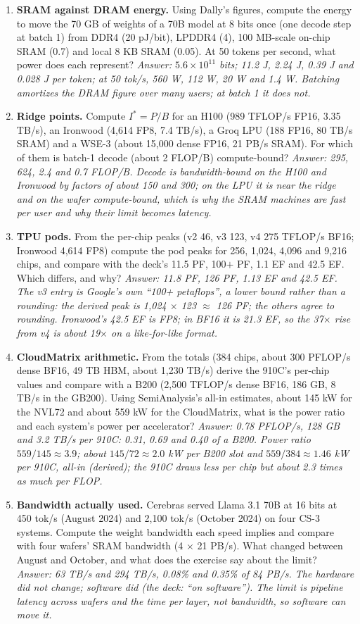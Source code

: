 \documentclass[11pt,letterpaper]{article}
\begin{document}
\begin{enumerate}[leftmargin=1.6em,itemsep=6pt]
\item \textbf{SRAM against DRAM energy.} Using Dally's figures, compute the energy to move the 70 GB of weights of a 70B model at 8 bits once (one decode step at batch 1) from DDR4 (20 pJ/bit), LPDDR4 (4), 100 MB-scale on-chip SRAM (0.7) and local 8 KB SRAM (0.05). At 50 tokens per second, what power does each represent? \emph{Answer: $5.6\times10^{11}$ bits; 11.2 J, 2.24 J, 0.39 J and 0.028 J per token; at 50 tok/s, 560 W, 112 W, 20 W and 1.4 W. Batching amortizes the DRAM figure over many users; at batch 1 it does not.}
\item \textbf{Ridge points.} Compute $I^\ast = P/B$ for an H100 (989 TFLOP/s FP16, 3.35 TB/s), an Ironwood (4{,}614 FP8, 7.4 TB/s), a Groq LPU (188 FP16, 80 TB/s SRAM) and a WSE-3 (about 15{,}000 dense FP16, 21 PB/s SRAM). For which of them is batch-1 decode (about 2 FLOP/B) compute-bound? \emph{Answer: 295, 624, 2.4 and 0.7 FLOP/B. Decode is bandwidth-bound on the H100 and Ironwood by factors of about 150 and 300; on the LPU it is near the ridge and on the wafer compute-bound, which is why the SRAM machines are fast per user and why their limit becomes latency.}
\item \textbf{TPU pods.} From the per-chip peaks (v2 46, v3 123, v4 275 TFLOP/s BF16; Ironwood 4{,}614 FP8) compute the pod peaks for 256, 1{,}024, 4{,}096 and 9{,}216 chips, and compare with the deck's 11.5 PF, 100$+$ PF, 1.1 EF and 42.5 EF. Which differs, and why? \emph{Answer: 11.8 PF, 126 PF, 1.13 EF and 42.5 EF. The v3 entry is Google's own ``100+ petaflops'', a lower bound rather than a rounding: the derived peak is 1{,}024 $\times$ 123 $\approx$ 126 PF; the others agree to rounding. Ironwood's 42.5 EF is FP8; in BF16 it is 21.3 EF, so the 37$\times$ rise from v4 is about 19$\times$ on a like-for-like format.}
\item \textbf{CloudMatrix arithmetic.} From the totals (384 chips, about 300 PFLOP/s dense BF16, 49 TB HBM, about 1{,}230 TB/s) derive the 910C's per-chip values and compare with a B200 (2{,}500 TFLOP/s dense BF16, 186 GB, 8 TB/s in the GB200). Using SemiAnalysis's all-in estimates, about 145 kW for the NVL72 and about 559 kW for the CloudMatrix, what is the power ratio and each system's power per accelerator? \emph{Answer: 0.78 PFLOP/s, 128 GB and 3.2 TB/s per 910C: 0.31, 0.69 and 0.40 of a B200. Power ratio $559/145 \approx 3.9$; about $145/72 \approx 2.0$ kW per B200 slot and $559/384 \approx 1.46$ kW per 910C, all-in (derived); the 910C draws less per chip but about 2.3 times as much per FLOP.}
\item \textbf{Bandwidth actually used.} Cerebras served Llama 3.1 70B at 16 bits at 450 tok/s (August 2024) and 2{,}100 tok/s (October 2024) on four CS-3 systems. Compute the weight bandwidth each speed implies and compare with four wafers' SRAM bandwidth (4 $\times$ 21 PB/s). What changed between August and October, and what does the exercise say about the limit? \emph{Answer: 63 TB/s and 294 TB/s, 0.08\% and 0.35\% of 84 PB/s. The hardware did not change; software did (the deck: ``on software''). The limit is pipeline latency across wafers and the time per layer, not bandwidth, so software can move it.}

\end{enumerate}
\end{document}
